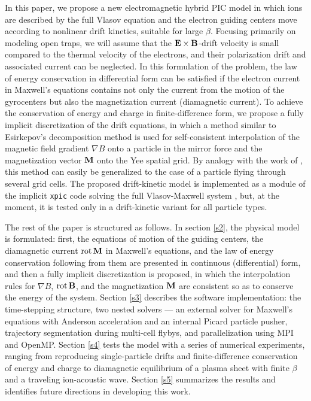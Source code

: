 \documentclass[final,3p]{elsarticle}
\newcommand{\rot}{\mbox{\rm{rot\,}}}
\begin{document}
In this paper, we propose a new electromagnetic hybrid PIC model in which ions are described by the full Vlasov equation and the electron guiding centers move according to nonlinear drift kinetics, suitable for large $\beta$. Focusing primarily on modeling open traps, we will assume that the ${\bf E}\times{\bf B}$-drift velocity  is small compared to the thermal velocity of the electrons, and their polarization drift and associated current can be neglected. In this formulation of the problem, the law of energy conservation in differential form can be satisfied if the electron current in Maxwell's equations contains not only the current from the motion of the gyrocenters but also the magnetization current (diamagnetic current). To achieve the conservation of energy and charge in finite-difference form, we propose a fully implicit discretization of the drift equations, in which a method similar to Esirkepov's decomposition method \cite{Esirkepov2001} is used for self-consistent interpolation of the magnetic field gradient $\nabla B$ onto a particle in the mirror force and the magnetization vector ${\bf M}$ onto the Yee spatial grid. By analogy with the work of \cite{Chen2023}, this method can easily be generalized to the case of a particle flying through several grid cells.
The proposed drift-kinetic model is implemented as a module of the implicit \texttt{xpic} code solving the full Vlasov-Maxwell system \cite{Kurshakov2026}, but, at the moment, it is tested only in a drift-kinetic variant for all particle types.



The rest of the paper is structured as follows. In section \ref{s2}, the physical model is formulated: first, the equations of motion of the guiding centers, the diamagnetic current $\rot{\bf M}$ in Maxwell's equations, and the law of energy conservation following from them are presented in continuous (differential) form, and then a fully implicit discretization is proposed, in which the interpolation rules for $\nabla B$, $\rot{\bf B}$, and the magnetization ${\bf M}$ are consistent so as to conserve the energy of the system. Section \ref{s3} describes the software implementation: the time-stepping structure, two nested solvers --- an external solver for Maxwell's equations with Anderson acceleration and an internal Picard particle pusher, trajectory segmentation during multi-cell flybys, and parallelization using MPI and OpenMP. Section \ref{s4} tests the model with a series of numerical experiments, ranging from reproducing single-particle drifts and finite-difference conservation of energy and charge to diamagnetic equilibrium of a plasma sheet with finite $\beta$ and a traveling ion-acoustic wave. Section \ref{s5} summarizes the results and identifies future directions in developing this work.
\end{document}
